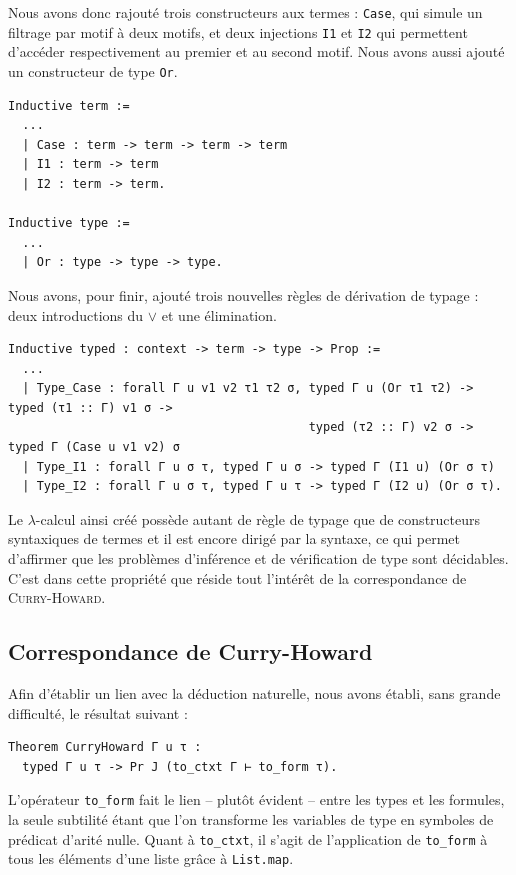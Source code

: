 \documentclass[a4paper]{article}
\begin{document}
Nous avons donc rajouté trois constructeurs aux termes : \verb+Case+, qui simule un filtrage par motif à deux motifs, et deux injections \verb+I1+ et \verb+I2+ qui permettent d'accéder respectivement au premier et au second motif. Nous avons aussi ajouté un constructeur de type \verb+Or+.
\begin{verbatim}
Inductive term :=
  ...
  | Case : term -> term -> term -> term
  | I1 : term -> term
  | I2 : term -> term.

Inductive type :=
  ...
  | Or : type -> type -> type.
\end{verbatim}

Nous avons, pour finir, ajouté trois nouvelles règles de dérivation de typage : deux introductions du $\vee$ et une élimination.
\begin{verbatim}
Inductive typed : context -> term -> type -> Prop :=
  ...
  | Type_Case : forall Γ u v1 v2 τ1 τ2 σ, typed Γ u (Or τ1 τ2) -> typed (τ1 :: Γ) v1 σ ->
                                          typed (τ2 :: Γ) v2 σ -> typed Γ (Case u v1 v2) σ
  | Type_I1 : forall Γ u σ τ, typed Γ u σ -> typed Γ (I1 u) (Or σ τ)
  | Type_I2 : forall Γ u σ τ, typed Γ u τ -> typed Γ (I2 u) (Or σ τ).
\end{verbatim}
\smallskip

Le $\lambda$-calcul ainsi créé possède autant de règle de typage que de constructeurs syntaxiques de termes et il est encore dirigé par la syntaxe, ce qui permet d'affirmer que les problèmes d'inférence et de vérification de type sont décidables. C'est dans cette propriété que réside tout l'intérêt de la correspondance de \textsc{Curry-Howard}.

\subsection{Correspondance de {\sc Curry-Howard}}

Afin d'établir un lien avec la déduction naturelle, nous avons établi, sans grande difficulté, le résultat suivant :
\begin{verbatim}
Theorem CurryHoward Γ u τ :
  typed Γ u τ -> Pr J (to_ctxt Γ ⊢ to_form τ).
\end{verbatim}
L'opérateur \verb+to_form+ fait le lien -- plutôt évident -- entre les types et les formules, la seule subtilité étant que l'on transforme les variables de type en symboles de prédicat d'arité nulle. Quant à \verb+to_ctxt+, il s'agit de l'application de \verb+to_form+ à tous les éléments d'une liste grâce à \verb+List.map+.
\smallskip
\end{document}
